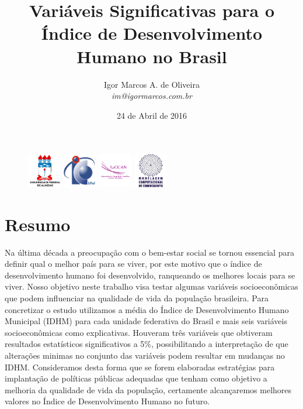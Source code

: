 \documentclass[10pt,foldmark,notumble]{leaflet}
\title{\bf Variáveis Significativas para o Índice de Desenvolvimento Humano no Brasil}
\author{
Igor Marcos A. de Oliveira \\ \emph{im@igormarcos.com.br}
}
\date{24 de Abril de 2016}
\begin{document}
\maketitle

\begin{figure}[H]
\centering
\includegraphics[height=1.5cm]{Images/aau_logo_new_circle-UFAL.pdf} \quad
\includegraphics[height=1.5cm]{Images/aau_logo_new_circle-IC.pdf} \quad
\includegraphics[height=1.5cm]{Images/aau_logo_new_circle-LACCAN.pdf} \quad
\includegraphics[height=1.5cm]{Images/aau_logo_new_circle-MODELAGEM.pdf}
\label{logo}
\end{figure}

\section{Resumo} Na última década a preocupação com o bem-estar social se tornou essencial para definir qual o melhor país para se viver, por este motivo que o índice de desenvolvimento humano foi desenvolvido, ranqueando os melhores locais para se viver. Nosso objetivo neste trabalho visa testar algumas variáveis socioeconômicas que podem influenciar na qualidade de vida da população brasileira. Para concretizar o estudo utilizamos a média do Índice de Desenvolvimento Humano Municipal (IDHM) para cada unidade federativa do Brasil e mais seis variáveis socioeconômicas como explicativas.
Houveram três variáveis que obtiveram resultados estatísticos significativos a 5\%, possibilitando a interpretação de que alterações minimas no conjunto das variáveis podem resultar em mudanças no IDHM. Consideramos desta forma que se forem elaboradas estratégias para implantação de políticas públicas adequadas que tenham como objetivo a melhoria da qualidade de vida da população, certamente alcançaremos melhores valores no Índice de Desenvolvimento Humano no futuro.
\end{document}
